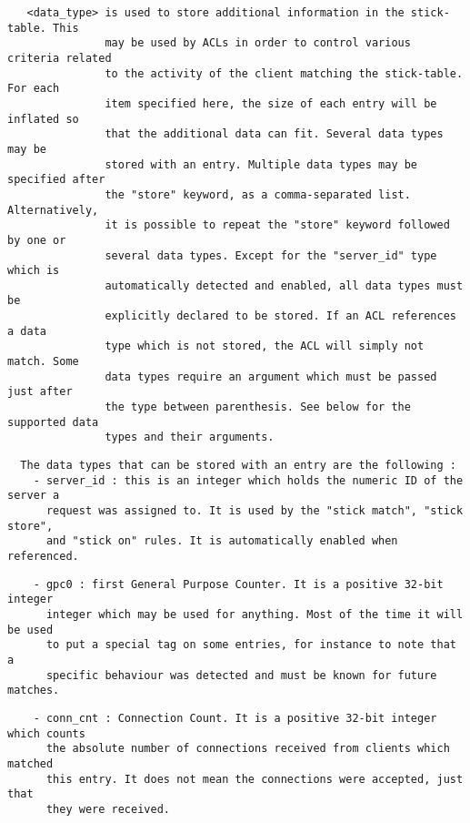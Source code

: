 \begin{verbatim}
   <data_type> is used to store additional information in the stick-table. This
               may be used by ACLs in order to control various criteria related
               to the activity of the client matching the stick-table. For each
               item specified here, the size of each entry will be inflated so
               that the additional data can fit. Several data types may be
               stored with an entry. Multiple data types may be specified after
               the "store" keyword, as a comma-separated list. Alternatively,
               it is possible to repeat the "store" keyword followed by one or
               several data types. Except for the "server_id" type which is
               automatically detected and enabled, all data types must be
               explicitly declared to be stored. If an ACL references a data
               type which is not stored, the ACL will simply not match. Some
               data types require an argument which must be passed just after
               the type between parenthesis. See below for the supported data
               types and their arguments.
\end{verbatim}

\begin{verbatim}
  The data types that can be stored with an entry are the following :
    - server_id : this is an integer which holds the numeric ID of the server a
      request was assigned to. It is used by the "stick match", "stick store",
      and "stick on" rules. It is automatically enabled when referenced.
\end{verbatim}

\begin{verbatim}
    - gpc0 : first General Purpose Counter. It is a positive 32-bit integer
      integer which may be used for anything. Most of the time it will be used
      to put a special tag on some entries, for instance to note that a
      specific behaviour was detected and must be known for future matches.
\end{verbatim}

\begin{verbatim}
    - conn_cnt : Connection Count. It is a positive 32-bit integer which counts
      the absolute number of connections received from clients which matched
      this entry. It does not mean the connections were accepted, just that
      they were received.
\end{verbatim}

